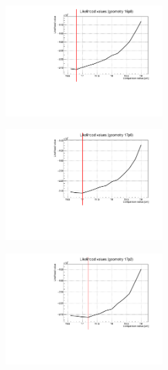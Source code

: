 \documentclass[a4paper, 11pt, twoside, openright]{report}
\begin{document}
\begin{figure}[htbp]
\centering
\begin{minipage}[b]{.32\textwidth}
\includegraphics[width=6cm, height=4.6cm]{figs/likelihood100LowStat/likelihood16p8.pdf}
\end{minipage}\hfill
\begin{minipage}[b]{.32\textwidth}
\includegraphics[width=6cm, height=4.6cm]{figs/likelihood100LowStat/likelihood17p0.pdf}
\end{minipage} \hfill
\begin{minipage}[b]{.32\textwidth}
\includegraphics[width=6cm, height=4.6cm]{figs/likelihood100LowStat/likelihood17p2.pdf}
\end{minipage} \hfill \vspace{10pt}


\end{figure}
\end{document}
